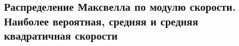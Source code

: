 \subsection{\textbf{Распределение Максвелла по модулю скорости.} Наиболее вероятная, средняя и средняя квадратичная скорости}